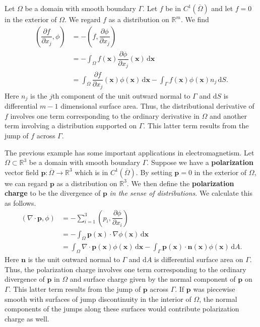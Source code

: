\begin{Example}
\label{ex:boundary-jump-derivative}
Let $\Omega$ be a domain with smooth boundary $\Gamma$. Let $f$ be in $C^1(\overline\Omega)$ and let $f=0$ in the exterior of $\Omega$. We regard $f$ as a distribution on $\mathbb{R}^m$. We find\[
\begin{aligned}
\left(\dfrac{\partial f}{\partial x_j},\phi\right)&=-\left(f,\dfrac{\partial\phi}{\partial x_j}\right)\\
&=-\int_\Omega f(\bm{x})\dfrac{\partial\phi}{\partial x_j}(\bm{x})\,\mathrm{d}\bm{x}\\
&=\int_\Omega\dfrac{\partial f}{\partial x_j}(\bm{x})\phi(\bm{x})\,\mathrm{d}\bm{x}
-\int_\Gamma f(\bm{x})\phi(\bm{x})n_j\,\mathrm{d}S.
\end{aligned}
\]Here $n_j$ is the $j$th component of the unit outward normal to $\Gamma$ and $\mathrm{d}S$ is differential $m-1$ dimensional surface area. Thus, the distributional derivative of $f$ involves one term corresponding to the ordinary derivative in $\Omega$ and another term involving a distribution supported on $\Gamma$. This latter term results from the jump of $f$ across $\Gamma$.
\end{Example}

\begin{Example}
\label{ex:polarization-charge}
The previous example has some important applications in electromagnetism. Let $\Omega\subset\mathbb{R}^3$ be a domain with smooth boundary $\Gamma$. Suppose we have a \textbf{polarization} vector field $\bm{p}:\overline\Omega\to\mathbb{R}^3$ which is in $C^1(\overline\Omega)$. By setting $\bm{p}=0$ in the exterior of $\Omega$, we can regard $\bm{p}$ as a distribution on $\mathbb{R}^3$. We then define the \textbf{polarization charge} to be the divergence of $\bm{p}$ \emph{in the sense of distributions}. We calculate this as follows.\[
\begin{aligned}
(\nabla\cdot\bm{p},\phi)&=-\sum_{i=1}^3\left(p_i,\dfrac{\partial\phi}{\partial x_i}\right)\\
&=-\int_\Omega\bm{p}(\bm{x})\cdot\nabla\phi(\bm{x})\,\mathrm{d}\bm{x}\\
&=\int_\Omega\nabla\cdot\bm{p}(\bm{x})\phi(\bm{x})\,\mathrm{d}\bm{x}
-\int_\Gamma\bm{p}(\bm{x})\cdot\bm{n}(\bm{x})\phi(\bm{x})\,\mathrm{d}A.
\end{aligned}
\]Here $\bm{n}$ is the unit outward normal to $\Gamma$ and $\mathrm{d}A$ is differential surface area on $\Gamma$. Thus, the polarization charge involves one term corresponding to the ordinary divergence of $\bm{p}$ in $\Omega$ and surface charge given by the normal component of $\bm{p}$ on $\Gamma$. This latter term results from the jump of $\bm{p}$ across $\Gamma$. If $\bm{p}$ was piecewise smooth with surfaces of jump discontinuity in the interior of $\Omega$, the normal components of the jumps along these surfaces would contribute polarization charge as well.
\end{Example}

